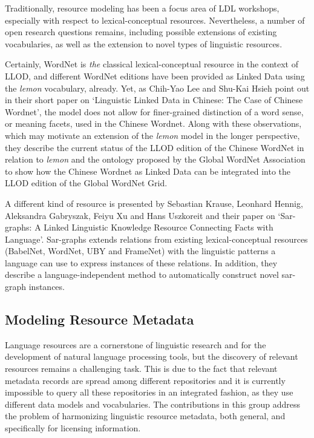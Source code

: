 Traditionally, resource modeling has been a focus area of LDL workshops, especially with respect to lexical-conceptual resources. 
Nevertheless, a number of open research questions remains, including possible extensions of existing vocabularies, as well as the extension to novel types of linguistic resources.

Certainly, WordNet is \emph{the} classical lexical-conceptual resource in the context of LLOD, and different WordNet editions have been provided as Linked Data using the \emph{lemon} vocabulary, already.
Yet, as Chih-Yao Lee and Shu-Kai Hsieh point out in their short paper on `Linguistic Linked Data in Chinese: The Case of Chinese Wordnet', the model does not allow for finer-grained distinction of a word sense, or meaning facets, used in the Chinese Wordnet. Along with these observations, which may motivate an extension of the \emph{lemon} model in the longer perspective, they describe the current status of the LLOD edition of the Chinese WordNet in relation to \emph{lemon} and the ontology proposed by the Global WordNet Association to show how the Chinese Wordnet as Linked Data can be integrated into the LLOD edition of the Global WordNet Grid.

A different kind of resource is presented by Sebastian Krause, Leonhard Hennig, Aleksandra Gabryszak, Feiyu Xu and Hans Uszkoreit and  their paper on `Sar-graphs: A Linked Linguistic Knowledge Resource Connecting Facts with Language'. Sar-graphs extends relations from existing lexical-conceptual resources (BabelNet, WordNet, UBY and FrameNet) with the linguistic patterns a language can use to express instances of these relations. In addition, they describe a language-independent method to automatically construct novel sar-graph instances. 

\subsection{Modeling Resource Metadata}

Language resources are a cornerstone of linguistic research and for the development of natural language processing tools, but the discovery of relevant resources remains a challenging task. 
This is due to the fact that relevant metadata records are spread among different repositories and it is currently impossible to query all these repositories in an integrated fashion, as they use different data models and vocabularies. The contributions in this group address the problem of harmonizing linguistic resource metadata, both general, and specifically for licensing information.

